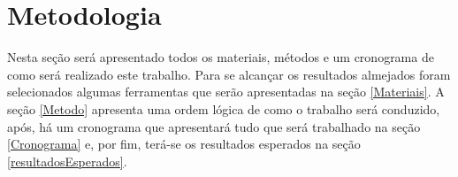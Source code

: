 \section{Metodologia}

Nesta seção será apresentado todos os materiais, métodos e um cronograma de como será realizado
este trabalho. Para se alcançar os resultados almejados foram selecionados algumas ferramentas que 
serão apresentadas na seção \ref{Materiais}. A seção \ref{Metodo} apresenta uma ordem lógica de como 
o trabalho será conduzido, após, há um cronograma que apresentará tudo que
será trabalhado na seção \ref{Cronograma} e, por fim, terá-se os resultados esperados na seção 
\ref{resultadosEsperados}.
